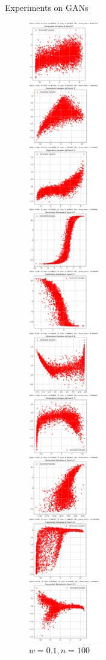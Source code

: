 \documentclass[final]{beamer}
\newlength{\colwidth}
\begin{document}
\begin{frame}[t]
\begin{columns}[t]
\begin{column}{\colwidth}
\begin{block}{Experiments on GANs}
\begin{figure}
\begin{minipage}{0.19\textwidth}
    \caption{$w=0.1,n=100$}
    \end{minipage}
    \begin{minipage}{0.19\textwidth}
    \centering
    \includegraphics[width=1\linewidth]{gan_cross/n=10/Jietu20250101-161535@2x.png}

\end{minipage}
\end{figure}
\end{block}
\end{column}
\end{columns}
\end{frame}
\end{document}
